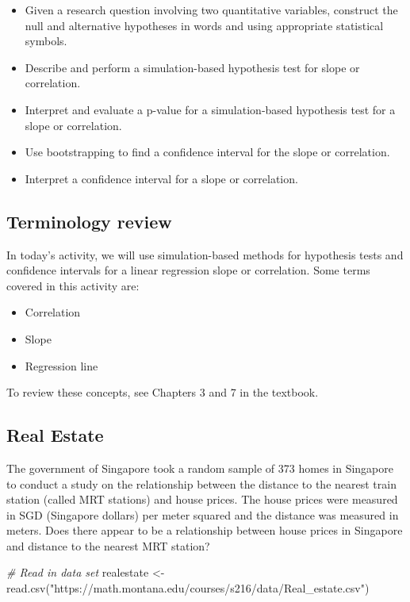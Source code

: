 \documentclass[
]{report}
\newenvironment{Shaded}{\begin{snugshade}}{\end{snugshade}}
\newcommand{\CommentTok}[1]{\textcolor[rgb]{0.56,0.35,0.01}{\textit{#1}}}
\newcommand{\FunctionTok}[1]{\textcolor[rgb]{0.00,0.00,0.00}{#1}}
\newcommand{\NormalTok}[1]{#1}
\newcommand{\OtherTok}[1]{\textcolor[rgb]{0.56,0.35,0.01}{#1}}
\newcommand{\StringTok}[1]{\textcolor[rgb]{0.31,0.60,0.02}{#1}}
\begin{document}
\begin{itemize}
\item
  Given a research question involving two quantitative variables, construct the null and alternative hypotheses
  in words and using appropriate statistical symbols.
\item
  Describe and perform a simulation-based hypothesis test for slope or correlation.
\item
  Interpret and evaluate a p-value for a simulation-based hypothesis test for a slope or correlation.
\item
  Use bootstrapping to find a confidence interval for the slope or correlation.
\item
  Interpret a confidence interval for a slope or correlation.
\end{itemize}

\hypertarget{terminology-review-23}{%
\subsection{Terminology review}\label{terminology-review-23}}

In today's activity, we will use simulation-based methods for hypothesis tests and confidence intervals for a linear regression slope or correlation. Some terms covered in this activity are:

\begin{itemize}
\item
  Correlation
\item
  Slope
\item
  Regression line
\end{itemize}

To review these concepts, see Chapters 3 and 7 in the textbook.

\hypertarget{real-estate}{%
\subsection{Real Estate}\label{real-estate}}

The government of Singapore took a random sample of 373 homes in Singapore to conduct a study on the relationship between the distance to the nearest train station (called MRT stations) and house prices. The house prices were measured in SGD (Singapore dollars) per meter squared and the distance was measured in meters. Does there appear to be a relationship between house prices in Singapore and distance to the nearest MRT station?

\begin{Shaded}
\begin{Highlighting}[]
\CommentTok{\# Read in data set}
\NormalTok{realestate }\OtherTok{\textless{}{-}} \FunctionTok{read.csv}\NormalTok{(}\StringTok{"https://math.montana.edu/courses/s216/data/Real\_estate.csv"}\NormalTok{)}
\end{Highlighting}
\end{Shaded}
\end{document}
